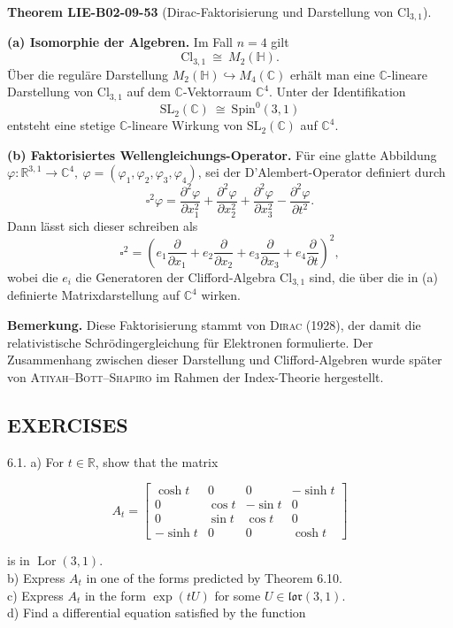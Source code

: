 \documentclass[10pt, letterpaper]{article}
\newcommand{\R}{\mathbb{R}}
\newcommand{\C}{\mathbb{C}}
\newcommand{\Cl}{\mathrm{Cl}}
\newcommand{\SL}{\mathrm{SL}}
\newcommand{\Spin}{\mathrm{Spin}}
\newcommand{\CustomHeading}[3]{%
  \par\medskip\noindent%
  \textbf{#1 #2} \textnormal{(#3)}.\enskip%
}
\newenvironment{THEO}[2]{\begin{unitbox}\CustomHeading{Theorem}{#1}{#2}}{\end{unitbox}}
\begin{document}
\begin{THEO}{LIE-B02-09-53}{Dirac-Faktorisierung und Darstellung von \(\Cl_{3,1}\)}
\textbf{(a) Isomorphie der Algebren.}
Im Fall \(n=4\) gilt
\[
\Cl_{3,1}\ \cong\ M_2(\mathbb{H}).
\]
Über die reguläre Darstellung \(M_2(\mathbb{H})\hookrightarrow M_4(\C)\)
erhält man eine \(\C\)-lineare Darstellung von \(\Cl_{3,1}\)
auf dem \(\C\)-Vektorraum \(\C^4\).
Unter der Identifikation
\[
\SL_2(\C)\ \cong\ \Spin^0(3,1)
\]
entsteht eine stetige \(\C\)-lineare Wirkung von \(\SL_2(\C)\)
auf \(\C^4\).

\textbf{(b) Faktorisiertes Wellengleichungs-Operator.}
Für eine glatte Abbildung
\(\varphi:\R^{3,1}\to\C^4,\ \varphi=(\varphi_1,\varphi_2,\varphi_3,\varphi_4)\),
sei der D’Alembert-Operator definiert durch
\[
\square^2\varphi
=\frac{\partial^2\varphi}{\partial x_1^2}
+\frac{\partial^2\varphi}{\partial x_2^2}
+\frac{\partial^2\varphi}{\partial x_3^2}
-\frac{\partial^2\varphi}{\partial t^2}.
\]
Dann lässt sich dieser schreiben als
\[
\square^2
=\left(e_1\frac{\partial}{\partial x_1}
+e_2\frac{\partial}{\partial x_2}
+e_3\frac{\partial}{\partial x_3}
+e_4\frac{\partial}{\partial t}\right)^2,
\]
wobei die \(e_i\) die Generatoren der Clifford-Algebra \(\Cl_{3,1}\) sind,
die über die in (a) definierte Matrixdarstellung auf \(\C^4\) wirken.

\textbf{Bemerkung.}
Diese Faktorisierung stammt von \textsc{Dirac} (1928), der damit die
relativistische Schrödingergleichung für Elektronen formulierte.
Der Zusammenhang zwischen dieser Darstellung und Clifford-Algebren
wurde später von \textsc{Atiyah–Bott–Shapiro} im Rahmen der Index-Theorie
hergestellt.
\end{THEO}




\pagebreak


\subsection{EXERCISES}

6.1. a) For $t \in \mathbb{R}$, show that the matrix

$$
A_{t}=\left[\begin{array}{cccc}
\cosh t & 0 & 0 & -\sinh t \\
0 & \cos t & -\sin t & 0 \\
0 & \sin t & \cos t & 0 \\
-\sinh t & 0 & 0 & \cosh t
\end{array}\right]
$$

is in $\operatorname{Lor}(3,1)$.\\
b) Express $A_{t}$ in one of the forms predicted by Theorem 6.10.\\
c) Express $A_{t}$ in the form $\exp (t U)$ for some $U \in \mathfrak{l o r}(3,1)$.\\
d) Find a differential equation satisfied by the function
\end{document}

